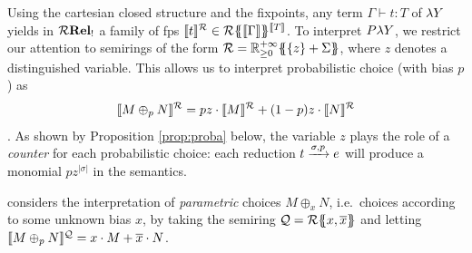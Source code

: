 	
Using the cartesian closed structure and the fixpoints, any term 
$\Gamma\vdash t:T$
 of $\lambda Y$ yields in $\mathcal{R}\mathbf{Rel_!}$
a family of fps $\llbracket t\rrbracket^{\mathcal{R}}\in {\mathcal{R}}\{\!\!\{\llbracket\Gamma\rrbracket\}\!\!\}^{\llbracket T\rrbracket}$.
To interpret $P\lambda Y$, we restrict our attention to semirings of the form $\mathcal{R}={\mathbb{R}^{+\infty}_{\geq 0}}\{\!\!\{\{z\}+\Sigma\}\!\!\}$, where $z$ denotes a distinguished variable. This allows us to interpret probabilistic choice (with bias $p$) as 
$$\llbracket M\oplus_p N\rrbracket^{\mathcal{R}}=p z\cdot\llbracket M\rrbracket^{\mathcal{R}}+(1-p) z\cdot\llbracket N\rrbracket^{\mathcal{R}}$$.
As shown by Proposition \ref{prop:proba} below, the variable $z$ plays the role of a \emph{counter} for each probabilistic choice: each reduction $t\xrightarrow{\sigma, p}e$ will produce a monomial $pz^{|\sigma|}$ in the semantics.
%
%	
%	




\begin{remark}\label{rem:tropical}
\cite{DBLP:journals/corr/abs-2501-15637} considers the interpretation of
\emph{parametric} choices  $M\oplus_x N$, i.e.~choices according to some unknown bias $x$, by taking the semiring 
  $\mathcal{Q}={\mathcal{R}}\{\!\!\{x,\overline x\}\!\!\}$ and letting $\llbracket M\oplus_p N\rrbracket^{\mathcal{Q}}=x\cdot M+\overline{x}\cdot N$. \end{remark}

